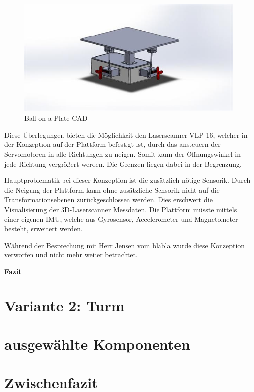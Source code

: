\begin{figure}[H]
	\centering
 	\includegraphics[width=1\textwidth]{resources/ballonaplate_cad}
	\caption{Ball on a Plate CAD {\cite{3ders.org}}}
	\label{fig:BalllonaPlateCAD}
\end{figure} 

 Diese Überlegungen bieten die Möglichkeit den Laserscanner VLP-16, welcher in der Konzeption auf der Plattform befestigt ist, durch das ansteuern der Servomotoren in alle Richtungen zu neigen. Somit kann  der Öffnungswinkel in jede Richtung vergrößert werden. Die Grenzen liegen dabei in der Begrenzung.
 
 Hauptproblematik bei dieser Konzeption ist die zusätzlich nötige Sensorik. Durch die Neigung der Plattform kann ohne zusätzliche Sensorik nicht auf die Transformationsebenen zurückgeschlossen werden. Dies erschwert die Visualisierung der 3D-Laserscanner Messdaten. Die Plattform müsste mittels einer eigenen IMU, welche aus Gyrosensor, Accelerometer und Magnetometer besteht, erweitert werden.
 
 Während der Besprechung mit Herr Jensen vom blabla  wurde diese Konzeption verworfen und nicht mehr weiter betrachtet.
 
 
 
 \textbf{Fazit}
 

\section {Variante 2: Turm}
\label{var2}



\section {ausgewählte Komponenten}

\section{Zwischenfazit}
\label{Zwischenfazit_konzept}
